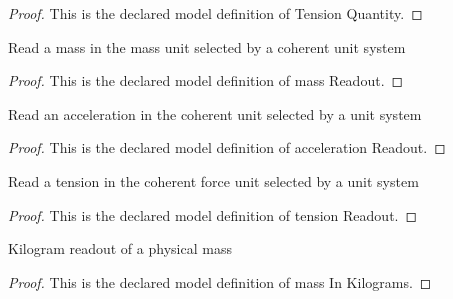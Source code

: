 \begin{proof}
  This is the declared model definition of Tension Quantity.
\end{proof}
\begin{definition}
  \label{def:physics:phyx-mini-0805:phyxminiproblems-problemphyxmini0805-massreadout}
  Read a mass in the mass unit selected by a coherent unit system
\end{definition}
\begin{proof}
  This is the declared model definition of mass Readout.
\end{proof}
\begin{definition}
  \label{def:physics:phyx-mini-0805:phyxminiproblems-problemphyxmini0805-accelerationreadout}
  Read an acceleration in the coherent unit selected by a unit system
\end{definition}
\begin{proof}
  This is the declared model definition of acceleration Readout.
\end{proof}
\begin{definition}
  \label{def:physics:phyx-mini-0805:phyxminiproblems-problemphyxmini0805-tensionreadout}
  Read a tension in the coherent force unit selected by a unit system
\end{definition}
\begin{proof}
  This is the declared model definition of tension Readout.
\end{proof}
\begin{definition}
  \label{def:physics:phyx-mini-0805:phyxminiproblems-problemphyxmini0805-massinkilograms}
  Kilogram readout of a physical mass
\end{definition}
\begin{proof}
  This is the declared model definition of mass In Kilograms.
\end{proof}
